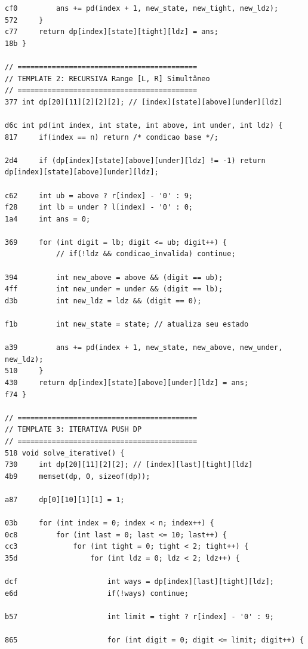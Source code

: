 \documentclass[11pt, a4paper, twoside]{article}
\begin{document}
{{\begin{lstlisting}
cf0         ans += pd(index + 1, new_state, new_tight, new_ldz);
572     }
c77     return dp[index][state][tight][ldz] = ans; 
18b }

// ==========================================
// TEMPLATE 2: RECURSIVA Range [L, R] Simultâneo
// ==========================================
377 int dp[20][11][2][2][2]; // [index][state][above][under][ldz]

d6c int pd(int index, int state, int above, int under, int ldz) {
817     if(index == n) return /* condicao base */;
    
2d4     if (dp[index][state][above][under][ldz] != -1) return dp[index][state][above][under][ldz];
    
c62     int ub = above ? r[index] - '0' : 9;
f28     int lb = under ? l[index] - '0' : 0;
1a4     int ans = 0;
    
369     for (int digit = lb; digit <= ub; digit++) {
            // if(!ldz && condicao_invalida) continue;
    
394         int new_above = above && (digit == ub);
4ff         int new_under = under && (digit == lb);
d3b         int new_ldz = ldz && (digit == 0);
            
f1b         int new_state = state; // atualiza seu estado
    
a39         ans += pd(index + 1, new_state, new_above, new_under, new_ldz);
510     }
430     return dp[index][state][above][under][ldz] = ans; 
f74 }

// ==========================================
// TEMPLATE 3: ITERATIVA PUSH DP
// ==========================================
518 void solve_iterative() {
730     int dp[20][11][2][2]; // [index][last][tight][ldz]
4b9     memset(dp, 0, sizeof(dp));
    
a87     dp[0][10][1][1] = 1;
    
03b     for (int index = 0; index < n; index++) {
0c8         for (int last = 0; last <= 10; last++) {
cc3             for (int tight = 0; tight < 2; tight++) {
35d                 for (int ldz = 0; ldz < 2; ldz++) {
                        
dcf                     int ways = dp[index][last][tight][ldz];
e6d                     if(!ways) continue;
    
b57                     int limit = tight ? r[index] - '0' : 9;
                        
865                     for (int digit = 0; digit <= limit; digit++) {
                            

\end{lstlisting}}}
\end{document}
